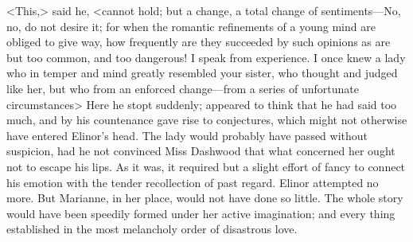 <This,> said he, <cannot hold; but a change, a total change of sentiments—No, no, do not desire it; for when the romantic refinements of a young mind are obliged to give way, how frequently are they succeeded by such opinions as are but too common, and too dangerous! I speak from experience. I once knew a lady who in temper and mind greatly resembled your sister, who thought and judged like her, but who from an enforced change—from a series of unfortunate circumstances\longdash> Here he stopt suddenly; appeared to think that he had said too much, and by his countenance gave rise to conjectures, which might not otherwise have entered Elinor's head. The lady would probably have passed without suspicion, had he not convinced Miss Dashwood that what concerned her ought not to escape his lips. As it was, it required but a slight effort of fancy to connect his emotion with the tender recollection of past regard. Elinor attempted no more. But Marianne, in her place, would not have done so little. The whole story would have been speedily formed under her active imagination; and every thing established in the most melancholy order of disastrous love.